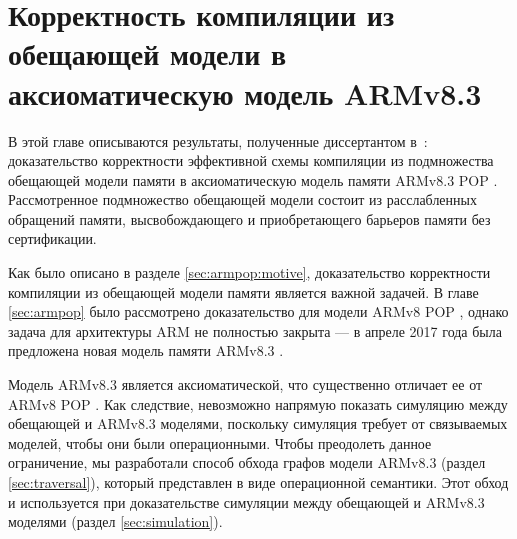 \chapter{Корректность компиляции из обещающей модели в аксиоматическую модель ARMv8.3} \label{sec:armv83}
В этой главе описываются результаты, полученные диссертантом
в~\cite{Podkopaev-al:NTV17,Podkopaev-al:ISPRAS17}:
доказательство корректности эффективной схемы компиляции из
подмножества обещающей модели памяти \cite{Kang-al:POPL17} в аксиоматическую
модель памяти ARMv8.3 POP \cite{Pulte-al:POPL18}.
Рассмотренное подмножество обещающей модели состоит из расслабленных обращений памяти,
высвобождающего и приобретающего барьеров памяти без сертификации.

Как было описано в разделе \ref{sec:armpop:motive}, доказательство корректности
компиляции из обещающей модели памяти является важной задачей. 
В главе \ref{sec:armpop} было рассмотрено доказательство для модели ARMv8 POP \cite{Flur-al:POPL16},
однако задача для архитектуры ARM не полностью закрыта --- 
в апреле 2017 года была предложена новая модель памяти ARMv8.3 \cite{ARMv82,Pulte-al:POPL18}.

Модель ARMv8.3 является аксиоматической,
что существенно отличает ее от ARMv8 POP \cite{Flur-al:POPL16}.
Как следствие, невозможно напрямую показать симуляцию между обещающей и ARMv8.3 моделями,
поскольку симуляция требует от связываемых моделей, чтобы они были операционными.
Чтобы преодолеть данное ограничение, мы разработали способ обхода графов модели ARMv8.3
(раздел \ref{sec:traversal}),
который представлен в виде операционной семантики.
Этот обход и используется при доказательстве симуляции между обещающей и ARMv8.3 моделями
(раздел \ref{sec:simulation}).


